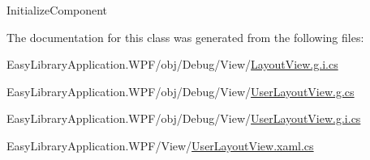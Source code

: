 Initialize\+Component 



The documentation for this class was generated from the following files\+:\begin{DoxyCompactItemize}
\item 
Easy\+Library\+Application.\+W\+P\+F/obj/\+Debug/\+View/\mbox{\hyperlink{_layout_view_8g_8i_8cs}{Layout\+View.\+g.\+i.\+cs}}\item 
Easy\+Library\+Application.\+W\+P\+F/obj/\+Debug/\+View/\mbox{\hyperlink{_debug_2_view_2_user_layout_view_8g_8cs}{User\+Layout\+View.\+g.\+cs}}\item 
Easy\+Library\+Application.\+W\+P\+F/obj/\+Debug/\+View/\mbox{\hyperlink{_user_layout_view_8g_8i_8cs}{User\+Layout\+View.\+g.\+i.\+cs}}\item 
Easy\+Library\+Application.\+W\+P\+F/\+View/\mbox{\hyperlink{_user_layout_view_8xaml_8cs}{User\+Layout\+View.\+xaml.\+cs}}\end{DoxyCompactItemize}
